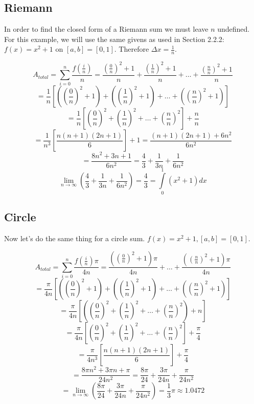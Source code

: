 \documentclass{article}
\begin{document}
    \subsection{Riemann}
      In order to find the closed form of a Riemann sum we must leave \( n \) undefined. For this example, we will use the same givens as used in Section 2.2.2: \( f(x) = x^2 + 1 \) on \( [a,b] = [0,1] \). Therefore \( \Delta x = \frac{1}{n} \).

      \[ A_{total} = \displaystyle \sum_{i=0}^n \frac{f(\frac{i}{n})}{n} = \frac{(\frac{0}{n})^2+1}{n} + \frac{(\frac{1}{n})^2+1}{n} + \dots + \frac{(\frac{n}{n})^2+1}{n} \]
      \[ = \frac{1}{n}\left[ \left( \left(\frac{0}{n}\right)^2 + 1 \right) + \left( \left(\frac{1}{n}\right)^2 + 1 \right) + \dots + \left( \left(\frac{n}{n}\right)^2 + 1 \right) \right] \]
      \[ = \frac{1}{n}\left[ \left( \frac{0}{n} \right)^2 + \left( \frac{1}{n} \right)^2 + \dots + \left( \frac{n}{n} \right)^2 \right] + \frac{n}{n} \]
      \[ = \frac{1}{n^3}\left[ \frac{n(n+1)(2n+1)}{6} \right] + 1 = \frac{(n+1)(2n+1) + 6n^2}{6n^2} \]
      \[ = \frac{8n^2+3n+1}{6n^2} = \frac{4}{3} + \frac{1}{3n} + \frac{1}{6n^2} \]
      \[ \displaystyle\lim_{n \to \infty}\left(\frac{4}{3} + \frac{1}{3n} + \frac{1}{6n^2} \right) = \frac{4}{3} = \int\limits_0^1 (x^2+1)dx \]

    \subsection{Circle}
      Now let's do the same thing for a circle sum. \( f(x) = x^2 + 1, [a,b] = [0,1] \).

      \[ A_{total} = \displaystyle \sum_{i=0}^n \frac{f\left(\frac{i}{n}\right)\pi}{4n} = \frac{(\left(\frac{0}{n}\right)^2+1)\pi}{4n} + \dots + \frac{(\left(\frac{n}{n}\right)^2+1)\pi}{4n} \]
      \[ = \frac{\pi}{4n}\left[\left(\left(\frac{0}{n}\right)^2 + 1 \right) + \left(\left(\frac{1}{n}\right)^2 + 1 \right) + \dots + \left(\left(\frac{n}{n}\right)^2 + 1 \right)\right] \]
      \[ = \frac{\pi}{4n}\left[\left(\left(\frac{0}{n}\right)^2 + \left(\frac{1}{n}\right)^2 + \dots + \left(\frac{n}{n}\right)^2\right) + n \right] \]
      \[ = \frac{\pi}{4n}\left[\left(\frac{0}{n}\right)^2 + \left(\frac{1}{n}\right)^2 + \dots + \left(\frac{n}{n}\right)^2 \right] + \frac{\pi}{4} \]
      \[ = \frac{\pi}{4n^3}\left[ \frac{n(n+1)(2n+1)}{6} \right] + \frac{\pi}{4} \]
      \[ = \frac{8\pi n^2 + 3\pi n + \pi}{24n^2} = \frac{8\pi}{24} + \frac{3\pi}{24n} + \frac{\pi}{24n^2} \]
      \[ = \displaystyle\lim_{n \to \infty}\left(\frac{8\pi}{24} + \frac{3\pi}{24n} + \frac{\pi}{24n^2}\right) = \frac{1}{3}\pi \approx 1.0472 \]
\end{document}
